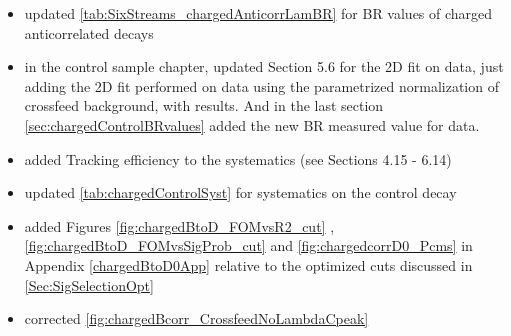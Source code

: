 \begin{itemize}
	\item updated \cref{tab:SixStreams_chargedAnticorrLamBR} for BR values of charged anticorrelated decays
	\item in the control sample chapter, updated Section 5.6 for the 2D fit on data, just adding the 2D fit performed on data using the parametrized normalization of crossfeed
background, with results. And in the last section \cref{sec:chargedControlBRvalues} added the new BR measured value for data.
    \item added Tracking efficiency to the systematics (see Sections 4.15 - 6.14)
    \item updated  \cref{tab:chargedControlSyst} for systematics on the control decay
    \item added Figures \ref{fig:chargedBtoD_FOMvsR2_cut} , \ref{fig:chargedBtoD_FOMvsSigProb_cut} and \ref{fig:chargedcorrD0_Pcms} in Appendix \ref{chargedBtoD0App} relative to the optimized cuts discussed in \cref{Sec:SigSelectionOpt}
    \item corrected \cref{fig:chargedBcorr_CrossfeedNoLambdaCpeak}
    
 
\end{itemize}

